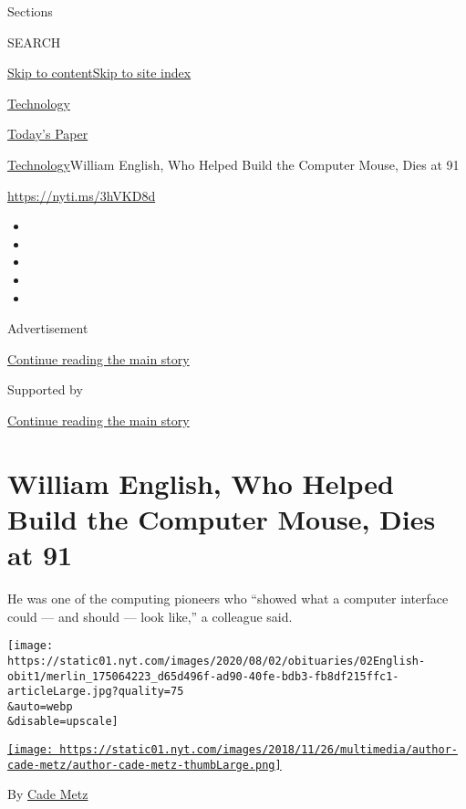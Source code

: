 Sections

SEARCH

\protect\hyperlink{site-content}{Skip to
content}\protect\hyperlink{site-index}{Skip to site index}

\href{https://www.nytimes.com/section/technology}{Technology}

\href{https://myaccount.nytimes.com/auth/login?response_type=cookie\&client_id=vi}{}

\href{https://www.nytimes.com/section/todayspaper}{Today's Paper}

\href{/section/technology}{Technology}\textbar{}William English, Who
Helped Build the Computer Mouse, Dies at 91

\url{https://nyti.ms/3hVKD8d}

\begin{itemize}
\item
\item
\item
\item
\item
\end{itemize}

Advertisement

\protect\hyperlink{after-top}{Continue reading the main story}

Supported by

\protect\hyperlink{after-sponsor}{Continue reading the main story}

\hypertarget{william-english-who-helped-build-the-computer-mouse-dies-at-91}{%
\section{William English, Who Helped Build the Computer Mouse, Dies at
91}\label{william-english-who-helped-build-the-computer-mouse-dies-at-91}}

He was one of the computing pioneers who ``showed what a computer
interface could --- and should --- look like,'' a colleague said.

\texttt{[image: https://static01.nyt.com/images/2020/08/02/obituaries/02English-obit1/merlin\_175064223\_d65d496f-ad90-40fe-bdb3-fb8df215ffc1-articleLarge.jpg?quality=75\\\&auto=webp\\\&disable=upscale]}

\href{https://www.nytimes.com/by/cade-metz}{\texttt{[image: https://static01.nyt.com/images/2018/11/26/multimedia/author-cade-metz/author-cade-metz-thumbLarge.png]}}

By \href{https://www.nytimes.com/by/cade-metz}{Cade Metz}


